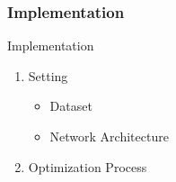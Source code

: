 \begin{frame}\frametitle{Implementation}
\begin{Large}
Implementation
\end{Large}
\begin{enumerate}
\item Setting
\begin{itemize}
\item Dataset 
\item Network Architecture 
\end{itemize}
\item Optimization Process
\end{enumerate}
\end{frame}

